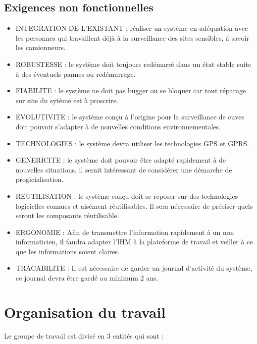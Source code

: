    \subsection{Exigences non fonctionnelles}

\begin{itemize}
\item INTEGRATION DE L'EXISTANT : réaliser un système en adéquation avec les personnes qui travaillent déjà à la surveillance des sites sensibles, à savoir les camionneurs.
\item ROBUSTESSE : le système doit toujours redémarré dans un état stable suite à des éventuels pannes ou redémarrage.
\item FIABILITE : le système ne doit pas bugger ou se bloquer car tout réparage sur site du sytème est à proscrire.
\item EVOLUTIVITE : le système conçu à l'origine pour la surveillance de cuves doit pouvoir s'adapter à de nouvelles conditions environnementales.
\item TECHNOLOGIES : le système devra utiliser les technologies GPS et GPRS.
\item GENERICITE : le système doit pouvoir être adapté rapidement à de nouvelles situations, il serait intéressant de considérer une démarche de progicialisation.
\item REUTILISATION : le système conçu doit se reposer sur des technologies logicielles connues et aisément réutilisables. Il sera nécessaire de préciser quels seront les composants réutilisable.
\item ERGONOMIE : Afin de transmettre l'information rapidement à un non informaticien, il faudra adapter l'IHM à la plateforme de travail et veiller à ce que les informations soient claires.
\item TRACABILITE : Il est nécessaire de garder un journal d'activité du système, ce journal devra être gardé au minimum 2 ans.
\end{itemize}
   
\section{Organisation du travail}

Le groupe de travail est divisé en 3 entités qui sont :

